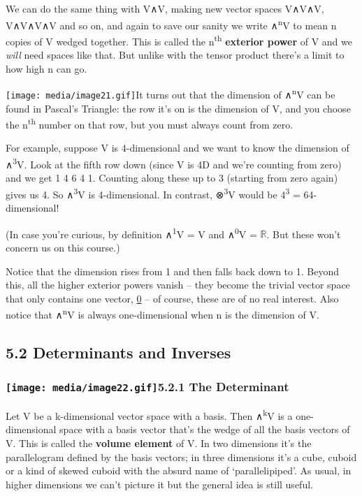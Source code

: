 \documentclass[oneside,english]{amsbook}
\numberwithin{section}{chapter}
\theoremstyle{plain}
\theoremstyle{definition}
\begin{document}
We can do the same thing with V∧V, making new vector spaces V∧V∧V,
V∧V∧V∧V and so on, and again to save our sanity we write
∧\textsuperscript{n}V to mean n copies of V wedged together. This is
called the n\textsuperscript{th} \textbf{exterior power} of V and we
\emph{will} need spaces like that. But unlike with the tensor product
there's a limit to how high n can go.

\texttt{[image: media/image21.gif]}It
turns out that the dimension of ∧\textsuperscript{n}V can be found in
Pascal's Triangle: the row it's on is the dimension of V, and you choose
the n\textsuperscript{th} number on that row, but you must always count
from zero.

For example, suppose V is 4-dimensional and we want to know the
dimension of ∧\textsuperscript{3}V. Look at the fifth row down (since V
is 4D and we're counting from zero) and we get 1 4 6 4 1. Counting along
these up to 3 (starting from zero again) gives us 4. So
∧\textsuperscript{3}V is 4-dimensional. In contrast,
⊗\textsuperscript{3}V would be 4\textsuperscript{3} = 64-dimensional!

(In case you're curious, by definition ∧\textsuperscript{1}V = V and
∧\textsuperscript{0}V = $\mathbb{R}$. But these won't concern us on this
course.)

Notice that the dimension rises from 1 and then falls back down to 1.
Beyond this, all the higher exterior powers vanish -- they become the
trivial vector space that only contains one vector, \ul{0} -- of course,
these are of no real interest. Also notice that ∧\textsuperscript{n}V is
always one-dimensional when n is the dimension of V.

\subsection{5.2 Determinants and
	Inverses}\label{determinants-and-inverses}

\subsubsection[5.2.1 The
Determinant]{\texorpdfstring{\protect\texttt{[image: media/image22.gif]}5.2.1
		The
		Determinant}{The Parallelepiped5.2.1 The Determinant}}\label{the-parallelepiped5.2.1-the-determinant}

Let V be a k-dimensional vector space with a basis. Then
∧\textsuperscript{k}V is a one-dimensional space with a basis vector
that's the wedge of all the basis vectors of V. This is called the
\textbf{volume element} of V. In two dimensions it's the parallelogram
defined by the basis vectors; in three dimensions it's a cube, cuboid or
a kind of skewed cuboid with the absurd name of `parallelipiped'. As
usual, in higher dimensions we can't picture it but the general idea is
still useful.
\end{document}
